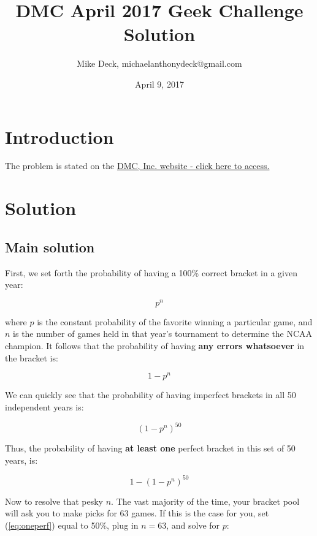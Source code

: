 \documentclass{article}
\title{DMC April 2017 Geek Challenge Solution}
\author{Mike Deck, michaelanthonydeck@gmail.com }
\date{April 9, 2017}
\begin{document}
\lstset{basicstyle=\ttfamily}
\maketitle

\section{Introduction}

The problem is stated on the \href{https://www.dmcinfo.com/latest-thinking/blog/id/9403/geek-challenge-the-perfect-bracket}{DMC, Inc. website - click here to access.} 

\section{Solution}

\subsection{Main solution}

First, we set forth the probability of having a 100\% correct bracket in a given year:

\begin{equation} \label{eq:probone}
    p^n
\end{equation}

where $p$ is the constant probability of the favorite winning a particular game, and $n$ is the number of games held in that year's tournament to determine the NCAA champion. It follows that the probability of having \textbf{any errors whatsoever} in the bracket is:

\begin{equation} 
    1 - p^n
\end{equation}

We can quickly see that the probability of having imperfect brackets in all 50 independent years is:

\begin{equation} \label{eq:permabad}
    (1 - p^n)^{50}
\end{equation}

Thus, the probability of having \textbf{at least one} perfect bracket in this set of 50 years, is:

\begin{equation} \label{eq:oneperf}
    1 - (1 - p^n)^{50}
\end{equation}

Now to resolve that pesky $n$. The vast majority of the time, your bracket pool will ask you to make picks for 63 games. If this is the case for you, set (\ref{eq:oneperf}) equal to 50\%, plug in $n=63$, and solve for $p$:
\end{document}
